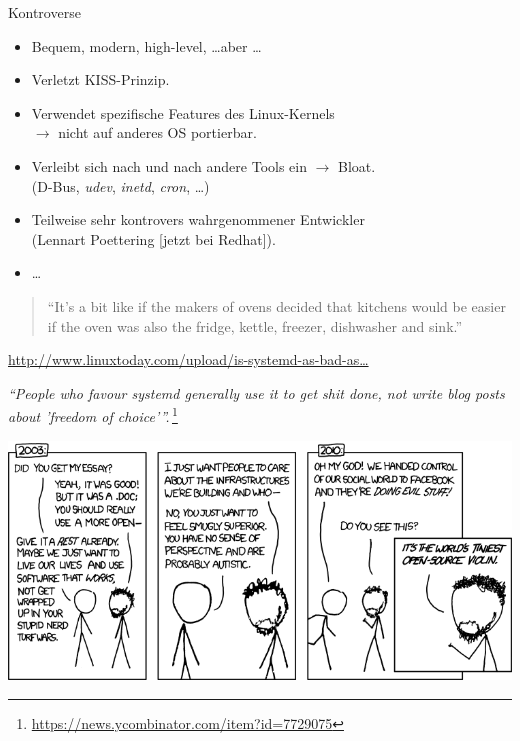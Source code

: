 \begin{frame}{Kontroverse}
\begin{itemize}
\item Bequem, modern, high-level, \dots aber \dots
\item Verletzt KISS-Prinzip.
\item Verwendet spezifische Features des Linux-Kernels\\ $\rightarrow$
nicht auf anderes OS portierbar.
\item Verleibt sich nach und nach andere Tools ein $\rightarrow$
Bloat.\\ (D-Bus, \emph{udev}, \emph{inetd}, \emph{cron}, \dots)
\item Teilweise sehr kontrovers wahrgenommener Entwickler\\ (Lennart
Poettering [jetzt bei Redhat]).
\item \dots
\end{itemize}

\begin{quote}
``It's a bit like if the makers of ovens decided that kitchens would be
easier if the oven was also the fridge, kettle, freezer, dishwasher and
sink.''
\end{quote}
\hfill{\footnotesize\href{http://www.linuxtoday.com/upload/is-systemd-as-bad-as-boycott-systemd-is-trying-to-make-it-140903095011.html}{http://www.linuxtoday.com/upload/is-systemd-as-bad-as\dots}}
\end{frame}

\begin{frame}[plain]
\emph{``People who favour systemd generally use it to get shit done, not
write blog posts about 'freedom of
choice'{}''.}\,\footnote{\url{https://news.ycombinator.com/item?id=7729075}}

\includegraphics[width=\textwidth]{files/xkcd743-infrastructures.png}
\end{frame}

